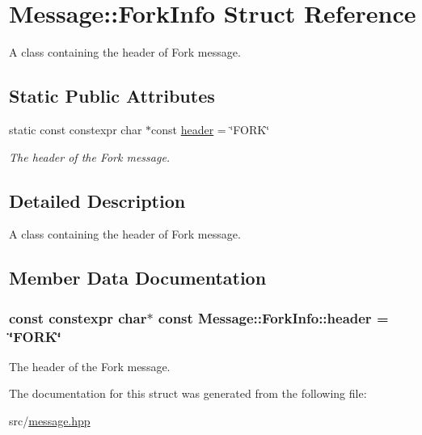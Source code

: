 \hypertarget{struct_message_1_1_fork_info}{}\section{Message\+:\+:Fork\+Info Struct Reference}
\label{struct_message_1_1_fork_info}


A class containing the header of Fork message.  


\subsection*{Static Public Attributes}
\begin{DoxyCompactItemize}
\item 
static const constexpr char $\ast$const \hyperlink{struct_message_1_1_fork_info_a87dc098addddec52c8eacd4975d84c84}{header} = \char`\"{}F\+O\+RK\char`\"{}
\begin{DoxyCompactList}\small\item\em The header of the Fork message. \end{DoxyCompactList}\end{DoxyCompactItemize}


\subsection{Detailed Description}
A class containing the header of Fork message. 

\subsection{Member Data Documentation}
\subsubsection[{\texorpdfstring{header}{header}}]{\setlength{\rightskip}{0pt plus 5cm}const constexpr char$\ast$ const Message\+::\+Fork\+Info\+::header = \char`\"{}F\+O\+RK\char`\"{}\hspace{0.3cm}{\ttfamily [static]}}\hypertarget{struct_message_1_1_fork_info_a87dc098addddec52c8eacd4975d84c84}{}\label{struct_message_1_1_fork_info_a87dc098addddec52c8eacd4975d84c84}


The header of the Fork message. 



The documentation for this struct was generated from the following file\+:\begin{DoxyCompactItemize}
\item 
src/\hyperlink{message_8hpp}{message.\+hpp}\end{DoxyCompactItemize}
